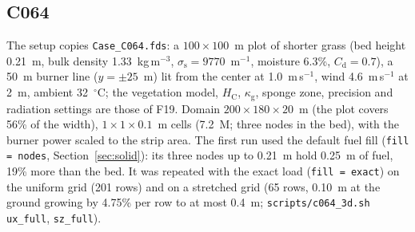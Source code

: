 \documentclass[11pt,a4paper]{article}
\newcommand{\code}[1]{\texttt{#1}}
\begin{document}
\subsection{C064}
The setup copies \code{Case\_C064.fds}: a $100\times100$~m plot of shorter grass (bed height 0.21~m, bulk
density 1.33~kg\,m$^{-3}$, $\sigma_\text{s}=9770$~m$^{-1}$, moisture 6.3\%, $C_\text{d}=0.7$), a 50~m burner
line ($y=\pm25$~m) lit from the center at 1.0~m\,s$^{-1}$, wind 4.6~m\,s$^{-1}$ at 2~m, ambient 32~$^\circ$C; the
vegetation model, $H_\text{C}$, $\kappa_\text{g}$, sponge zone, precision and radiation settings are those of F19.
Domain $200\times180\times20$~m (the plot covers 56\% of the width), $1\times1\times0.1$~m cells (7.2~M; three
nodes in the bed), with the burner power scaled to the strip area. The first run used the default fuel fill
(\code{fill = nodes}, Section~\ref{sec:solid}): its three nodes up to 0.21~m hold 0.25~m of fuel, 19\% more
than the bed. It was repeated with the exact load (\code{fill = exact}) on the uniform grid (201 rows) and on a
stretched grid (65 rows, 0.10~m at the ground growing by 4.75\% per row to at most 0.4~m;
\code{scripts/c064\_3d.sh ux\_full}, \code{sz\_full}).
\end{document}
